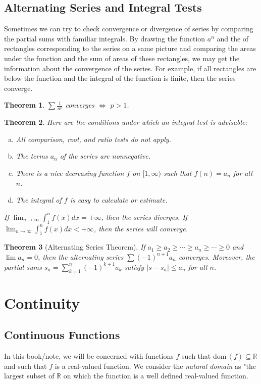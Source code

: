 \documentclass[12pt, lettersize]{book}
\theoremstyle{plain}
\newtheorem{thm}{Theorem}[section]
\theoremstyle{definition}
\theoremstyle{remark}
\newcommand{\R}{\mathbb{R}}
\newcommand{\dom}{\text{dom}\,}
\begin{document}
	\section{Alternating Series and Integral Tests}
	Sometimes we can try to check convergence or divergence of series by comparing the partial sums with familiar
	integrals. By drawing the function $a^n$ and the of rectangles corresponding to the series on a same picture and comparing the areas under the function and the sum of areas of these rectangles, we may get the information about the convergence of the series. For example, if all rectangles are below the function and the integral of the function is finite, then the series converge.
	\begin{thm}
		$\sum\frac{1}{n^p}$ converges $\iff$ $p>1$.
	\end{thm}
	
	\begin{thm}
		Here are the conditions under which an integral test is advisable:
		\begin{enumerate}[(a)]
			\item All comparison, root, and ratio tests do not apply.
			\item The terms $a_n$ of the series are nonnegative.
			\item There is a nice decreasing function $f$ on $[1,\infty)$ such that $f(n)=a_n$ for all $n$.
			\item The integral of $f$ is easy to calculate or estimate.
		\end{enumerate}
		If $\lim_{n\rightarrow\infty}\int_{1}^{n}f(x)dx=+\infty$, then the series diverges. If $\lim_{n\rightarrow\infty}\int_{1}^{n}f(x)dx<+\infty$, then the series will converge.
	\end{thm}
	
	\begin{thm}[Alternating Series Theorem]\label{def:alternating series}
		If $a_1\geq a_2\geq\cdots\geq a_n\geq\cdots\geq0$ and $\lim a_n=0$, then the alternating series $\sum(-1)^{n+1}a_n$
		converges. Moreover, the partial sums $s_n=\sum_{k=1}^{n}(-1)^{k+1}a_k$ satisfy $|s-s_n|\leq a_n$ for all $n$.
	\end{thm}
	
	\newpage
	
	\chapter{Continuity}
		\newpage
		\section{Continuous Functions}
		In this book/note, we will be concerned with functions $f$ such that $\dom(f)\subseteq\R$ and such that $f$ is
		a real-valued function. We consider the \emph{natural domain} as "the largest subset of $\R$ on which the function is a well defined real-valued function. 
		
\end{document}

